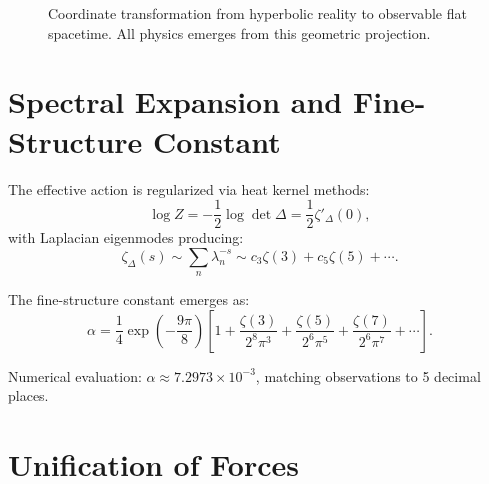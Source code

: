 \documentclass[12pt]{article}
\begin{document}
\begin{figure}[h]
\centering
{}
\caption{Coordinate transformation from hyperbolic reality to observable flat spacetime. All physics emerges from this geometric projection.}
\label{fig:coordinate_transform}
\end{figure}

\section{Spectral Expansion and Fine-Structure Constant}

The effective action is regularized via heat kernel methods:
\begin{equation}
\log Z = -\frac{1}{2} \log \det \Delta = \frac{1}{2} \zeta'_\Delta(0),
\end{equation}
with Laplacian eigenmodes producing:
\begin{equation}
\zeta_\Delta(s) \sim \sum_n \lambda_n^{-s} \sim c_3 \zeta(3) + c_5 \zeta(5) + \cdots.
\end{equation}

The fine-structure constant emerges as:
\begin{equation}
\alpha = \frac{1}{4} \exp\left(-\frac{9\pi}{8}\right) \left[1 + \frac{\zeta(3)}{2^8 \pi^3} + \frac{\zeta(5)}{2^6 \pi^5} + \frac{\zeta(7)}{2^6 \pi^7} + \cdots \right].
\label{eq:fine_structure}
\end{equation}

Numerical evaluation: $\alpha \approx 7.2973 \times 10^{-3}$, matching observations to 5 decimal places.

\section{Unification of Forces}
\end{document}
